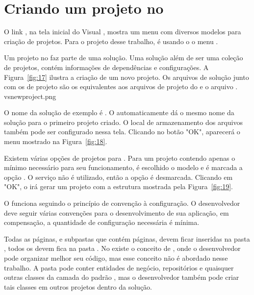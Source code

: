 \section{Criando um projeto \anmvc no }

O link , na tela inicial do Visual , mostra um menu com diversos modelos para criação de projetos. Para o projeto desse trabalho, é usando o  o menu .

Um projeto no  faz parte de uma solução. Uma solução além de ser uma coleção de projetos, contém informações de dependências e configurações. A Figura~\ref{fig:17} ilustra a criação de um novo projeto. Os arquivos de solução junto com os de projeto são os equivalentes aos arquivos de projeto do  e o arquivo . vsnewproject.png


O nome da solução de exemplo é . O  automaticamente dá o mesmo nome da solução para o primeiro projeto criado. O local de armazenamento dos arquivos também pode ser configurado nessa tela. Clicando no botão "OK", aparecerá o menu mostrado na Figura~\ref{fig:18}.


Existem várias opções de projetos para . Para um projeto  contendo apenas o mínimo necessário para seu funcionamento, é escolhido o modelo  e é marcada a opção . O serviço  não é utilizado, então a opção  é desmarcada. Clicando em "OK", o  irá gerar um projeto com a estrutura mostrada pela Figura~\ref{fig:19}.


O \anmvc funciona seguindo o princípio de convenção à configuração. O desenvolvedor deve seguir várias convenções para o desenvolvimento de sua aplicação, em compensação, a quantidade de configuração necessária é mínima.

Todas as páginas, e subpastas que contém páginas, devem ficar inseridas na pasta , todos os  devem fica na pasta . No  existe o conceito de , onde o desenvolvedor pode organizar melhor seu código, mas esse conceito não é abordado nesse trabalho. A pasta  pode conter entidades de negócio, repositórios e quaisquer outras classes da camada  do padrão , mas o desenvolvedor também pode criar tais classes em outros projetos dentro da solução.

